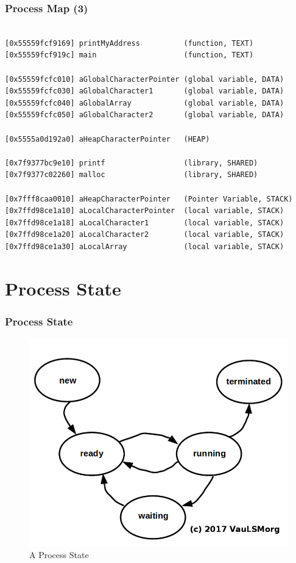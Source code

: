 \documentclass[xcolor=table, notheorems, hyperref={pdfpagelabels=false}]{beamer}
\begin{document}
\begin{frame}[fragile]
\frametitle{Process Map (3)}
\begin{lstlisting}[basicstyle=\ttfamily\footnotesize] %  72

[0x55559fcf9169] printMyAddress          (function, TEXT)
[0x55559fcf919c] main                    (function, TEXT)

[0x55559fcfc010] aGlobalCharacterPointer (global variable, DATA)
[0x55559fcfc030] aGlobalCharacter1       (global variable, DATA)
[0x55559fcfc040] aGlobalArray            (global variable, DATA)
[0x55559fcfc050] aGlobalCharacter2       (global variable, DATA)

[0x5555a0d192a0] aHeapCharacterPointer   (HEAP)

[0x7f9377bc9e10] printf                  (library, SHARED)
[0x7f9377c02260] malloc                  (library, SHARED)

[0x7fff8caa0010] aHeapCharacterPointer   (Pointer Variable, STACK)
[0x7ffd98ce1a10] aLocalCharacterPointer  (local variable, STACK)
[0x7ffd98ce1a18] aLocalCharacter1        (local variable, STACK)
[0x7ffd98ce1a20] aLocalCharacter2        (local variable, STACK)
[0x7ffd98ce1a30] aLocalArray             (local variable, STACK)

\end{lstlisting}
\end{frame}

\section{Process State}
\begin{frame}[fragile]
\frametitle{Process State}
\begin{figure}
\includegraphics[width=0.70\linewidth]{os06-state}
\caption{A Process State}
\end{figure}
\end{frame}
\end{document}
